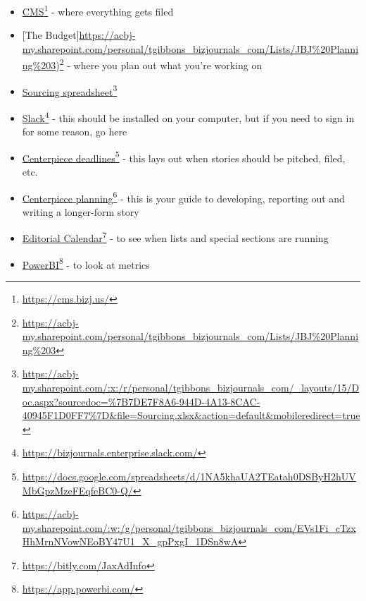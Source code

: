 \documentclass[
  11pt,
  american,
  letterpaperpaper,
  extrafontsizes,onecolumn,openright
  ]{memoir}
\providecommand{\tightlist}{%
  \setlength{\itemsep}{0pt}\setlength{\parskip}{0pt}}
\begin{document}
\begin{itemize}
\tightlist
\item
  \href{https://cms.bizj.us/}{CMS}\footnote{\url{https://cms.bizj.us/}} - where everything gets filed
\item
  {[}The Budget{]}\url{https://acbj-my.sharepoint.com/personal/tgibbons_bizjournals_com/Lists/JBJ\%20Planning\%203})\footnote{\url{https://acbj-my.sharepoint.com/personal/tgibbons_bizjournals_com/Lists/JBJ\%20Planning\%203}} - where you plan out what you're working on
\item
  \href{https://acbj-my.sharepoint.com/:x:/r/personal/tgibbons_bizjournals_com/_layouts/15/Doc.aspx?sourcedoc=\%7B7DE7F8A6-944D-4A13-8CAC-40945F1D0FF7\%7D\&file=Sourcing.xlsx\&action=default\&mobileredirect=true}{Sourcing spreadsheet}\footnote{\url{https://acbj-my.sharepoint.com/:x:/r/personal/tgibbons_bizjournals_com/_layouts/15/Doc.aspx?sourcedoc=\%7B7DE7F8A6-944D-4A13-8CAC-40945F1D0FF7\%7D\&file=Sourcing.xlsx\&action=default\&mobileredirect=true}}
\item
  \href{https://bizjournals.enterprise.slack.com/}{Slack}\footnote{\url{https://bizjournals.enterprise.slack.com/}} - this should be installed on your computer, but if you need to sign in for some reason, go here
\item
  \href{https://docs.google.com/spreadsheets/d/1NA5khaUA2TEatah0DSByH2hUVMbGpzMzeFEqfeBC0-Q/}{Centerpiece deadlines}\footnote{\url{https://docs.google.com/spreadsheets/d/1NA5khaUA2TEatah0DSByH2hUVMbGpzMzeFEqfeBC0-Q/}} - this lays out when stories should be pitched, filed, etc.
\item
  \href{https://acbj-my.sharepoint.com/:w:/g/personal/tgibbons_bizjournals_com/EVs1Fi_cTzxHhMrnNVowNEoBY47U1_X_gpPxgI_1DSn8wA}{Centerpiece planning}\footnote{\url{https://acbj-my.sharepoint.com/:w:/g/personal/tgibbons_bizjournals_com/EVs1Fi_cTzxHhMrnNVowNEoBY47U1_X_gpPxgI_1DSn8wA}} - this is your guide to developing, reporting out and writing a longer-form story
\item
  \href{https://bitly.com/JaxAdInfo}{Editorial Calendar}\footnote{\url{https://bitly.com/JaxAdInfo}} - to see when lists and special sections are running
\item
  \href{https://app.powerbi.com/home?experience=power-bi}{PowerBI}\footnote{\url{https://app.powerbi.com/}} - to look at metrics
\end{itemize}


\end{document}
